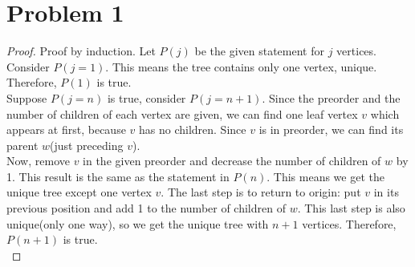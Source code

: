 \section*{Problem 1}
	\begin{proof}
		Proof by induction. Let $P(j)$ be the given statement for $j$ vertices. Consider $P(j=1)$. This means the tree contains only one vertex, unique. Therefore, $P(1)$ is true.\\
		Suppose $P(j=n)$ is true, consider $P(j=n+1)$. Since the preorder and the number of children of each vertex are given, we can find one leaf vertex $v$ which appears at first, because $v$ has no children. Since $v$ is in preorder, we can find its parent $w$(just preceding $v$).\\
		Now, remove $v$ in the given preorder and decrease the number of children of $w$ by 1. This result is the same as the statement in $P(n)$. This means we get the unique tree except one vertex $v$. The last step is to return to origin: put $v$ in its previous position and add 1 to the number of children of $w$. This last step is also unique(only one way), so we get the unique tree with $n+1$ vertices. Therefore, $P(n+1)$ is true.\\
	\end{proof}